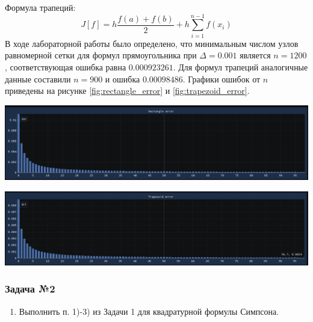 \documentclass[a4paper, fontsize=14pt]{article}
\begin{document}
    Формула трапеций:
    \begin{equation*}
        J[f] = h \frac{f(a) + f(b)}{2} + h \sum_{i=1}^{n-1} f(x_i)
    \end{equation*}
    В ходе лабораторной работы было определено, что минимальным числом узлов равномерной сетки для формул прямоугольника при $\Delta = 0.001$ является $n = 1200$, соответствующая ошибка равна $0.000923261$. 
    Для формул трапеций аналогичные данные составили $n = 900$ и ошибка $0.00098486$.
    Графики ошибок от $n$ приведены на рисунке \ref{fig:rectangle_error} и \ref{fig:trapezoid_error}.
    \begin{center}
        \includegraphics[scale=0.6]{src/rectangle_error.png}
        \label{fig:rectangle_error}
    \end{center}

    \begin{center}
        \includegraphics[scale=0.6]{src/trapezoid_error.png}
        \label{fig:trapezoid_error}
    \end{center}
    \newpage
\subsubsection*{Задача №2}
\begin{enumerate}
    \item Выполнить п. 1)-3) из Задачи 1 для квадратурной формулы Симпсона.
\end{enumerate}
\end{document}
